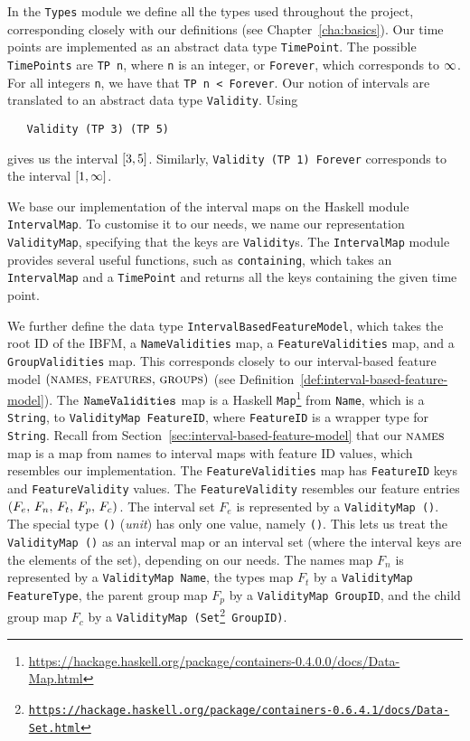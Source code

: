 In the \texttt{Types} module we define all the types used throughout the project, corresponding closely with our definitions (see Chapter~\vref{cha:basics}). Our time points are implemented as an abstract data type \texttt{TimePoint}. The possible \texttt{TimePoints} are \texttt{TP n}, where \texttt{n} is an integer, or \texttt{Forever}, which corresponds to $\infty$. For all integers \texttt{n}, we have that \texttt{TP n < Forever}. Our notion of intervals are translated to an abstract data type \texttt{Validity}. Using
\begin{verbatim}
   Validity (TP 3) (TP 5)
\end{verbatim}
gives us the interval $\interval{3}{5}$. Similarly, \texttt{Validity (TP 1) Forever} corresponds to the interval $\interval{1}{\forever}$. 

We base our implementation of the interval maps on the Haskell module \texttt{Interval\-Map}. To customise it to our needs, we name our representation \texttt{Validity\-Map}, specifying that the keys are \texttt{Validity}s. The \texttt{IntervalMap} module provides several useful functions, such as \texttt{containing}, which takes an \texttt{Interval\-Map} and a \texttt{Time\-Point} and returns all the keys containing the given time point.

We further define the data type \texttt{Interval\-Based\-Feature\-Model}, which takes the root ID of the IBFM, a \texttt{Name\-Validities} map, a \texttt{Feature\-Validities} map, and a \texttt{Group\-Validities} map. This corresponds closely to our interval-based feature model  $(\nobreak \textsc{names},\,\textsc{features},\, \textsc{groups}{})$ (see Definition~\vref{def:interval-based-feature-model}). The $\texttt{Name\-Validities}$ map is a Haskell \texttt{Map}\footnote{\url{https://hackage.haskell.org/package/containers-0.4.0.0/docs/Data-Map.html}} from \texttt{Name}, which is a \texttt{String}, to \texttt{Validity\-Map FeatureID}, where \texttt{FeatureID} is a wrapper type for \texttt{String}. Recall from Section~\ref{sec:interval-based-feature-model} that our $\textsc{names}{}$ map is a map from names to interval maps with feature ID values, which resembles our implementation. The \texttt{Feature\-Validities} map has \texttt{Feature\-ID} keys and \texttt{Feature\-Validity} values. The \texttt{Feature\-Validity} resembles our feature entries $\left(F_e,\, F_n,\, F_t,\, F_p,\, F_c\right){}$. The interval set $F_e$ is represented by a \texttt{Validity\-Map ()}. The special type \texttt{()} (\emph{unit}) has only one value, namely \texttt{()}. This lets us treat the \texttt{Validity\-Map ()} as an interval map or an interval set (where the interval keys are the elements of the set), depending on our needs. The names map $F_n$ is represented by a \texttt{Validity\-Map Name}, the types map $F_t$ by a \texttt{Validity\-Map Feature\-Type}, the parent group map $F_p$ by a \texttt{Validity\-Map Group\-ID}, and the child group map $F_c$ by a \texttt{Validity\-Map (Set\footnote{\url{https://hackage.haskell.org/package/containers-0.6.4.1/docs/Data-Set.html}} Group\-ID)}.

